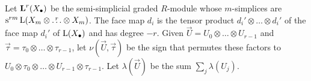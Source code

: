 




Let $\AA^r(X_\bullet)$ be the semi-simplicial graded $R$-module whose $m$-simplices are $\sus{rm}\rA(X_m\otimes \overset{r}{\ldots}\otimes X_m)$. The face map $d_i$ is the tensor product $d_i'\otimes \ldots\otimes d_i'$ of the face map $d_i'$ of $\rA(X_\bullet)$ and has degree $-r$. Given $\vec{U} = U_0\otimes \ldots\otimes U_{r-1}$ and $\vec{\tau} = \tau_0\otimes\ldots\otimes \tau_{r-1}$, let $\nu(\vec{U},\vec{\tau})$ be the sign that permutes these factors to $U_0\otimes \tau_0\otimes\ldots\otimes U_{r-1}\otimes \tau_{r-1}$. Let $\lambda(\vec{U})$ be the sum $\sum_j\lambda(U_j)$.


